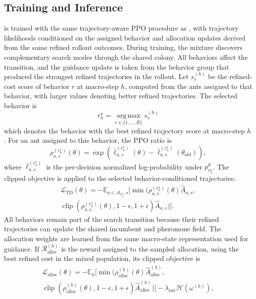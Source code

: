 \subsection{Training and Inference}
\label{sec:tdg-training}

\DyNACS{} is trained with the same trajectory-aware PPO procedure as \DyNACO{}, with trajectory likelihoods conditioned on the assigned behavior and allocation updates derived from the same refined rollout outcomes. During training, the mixture discovers complementary search modes through the shared colony. All behaviors affect the transition, and the guidance update is taken from the behavior group that produced the strongest refined trajectories in the rollout. Let $s_r^{(h)}$ be the refined-cost score of behavior $r$ at macro-step $h$, computed from the ants assigned to that behavior, with larger values denoting better refined trajectories. The selected behavior is
\begin{equation}
r_h^\star = \operatorname*{arg\,max}_{r\in\{1,\ldots,R\}} s_r^{(h)}
\end{equation}
which denotes the behavior with the best refined trajectory score at macro-step $h$. For an ant assigned to this behavior, the PPO ratio is
\begin{equation}
\rho_{a,s}^{(r_h^\star)}(\theta)
=
\exp\!\left(
\bar{\ell}_{a,s}^{(r_h^\star)}(\theta)
-\bar{\ell}_{a,s}^{(r_h^\star)}(\theta_{\mathrm{old}})
\right),
\end{equation}
where $\bar{\ell}_{a,s}^{(r_h^\star)}$ is the per-decision normalized log-probability under $p_{r_h^\star}^\theta$. The clipped objective is applied to the selected behavior-conditioned trajectories:
\begin{multline}
\mathcal{L}_{\mathrm{TD}}(\theta)
= -\mathbb{E}_{a\in\mathcal{A}_{r_h^\star},s}\Big[
\min\big(
\rho_{a,s}^{(r_h^\star)}(\theta)\hat{A}_{a,s},\\
\operatorname{clip}(\rho_{a,s}^{(r_h^\star)}(\theta),1-\epsilon,1+\epsilon)
\hat{A}_{a,s}\big)\Big].
\end{multline}
All behaviors remain part of the search transition because their refined trajectories can update the shared incumbent and pheromone field. The allocation weights are learned from the same macro-state representation used for guidance. If $\mathcal{R}_{\mathrm{alloc}}^{(h)}$ is the reward assigned to the sampled allocation, using the best refined cost in the mixed population, its clipped objective is
\begin{multline}
\mathcal{L}_{\mathrm{alloc}}(\theta)
= -\mathbb{E}_{h}\Big[
\min\big(
\rho_{\mathrm{alloc}}^{(h)}(\theta)\hat A_{\mathrm{alloc}}^{(h)},\\
\operatorname{clip}(\rho_{\mathrm{alloc}}^{(h)}(\theta),1-\epsilon,1+\epsilon)
\hat A_{\mathrm{alloc}}^{(h)}\big)\Big]
-\lambda_{\mathrm{ent}}\mathcal{H}(\omega^{(h)}),
\end{multline}
